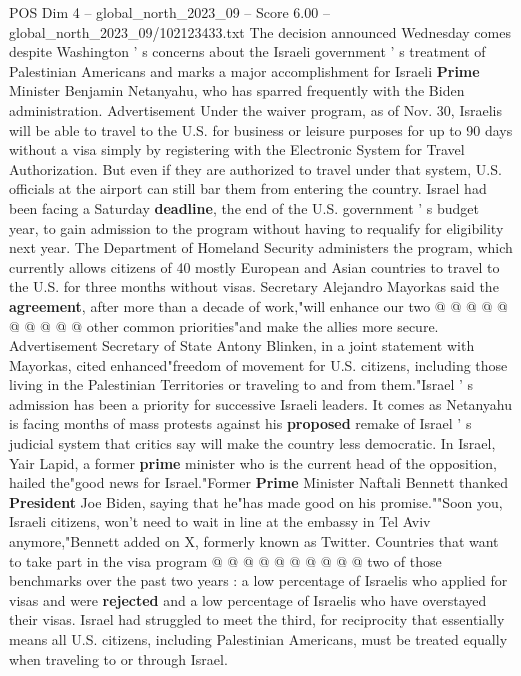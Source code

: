 \begin{textsample}{POS Dim 4 – global\_north\_2023\_09 – Score 6.00 – global\_north\_2023\_09/102123433.txt}  \label{ex:f4_pos_416}
The decision announced Wednesday comes despite Washington ' s concerns about the Israeli government ' s treatment of Palestinian Americans and marks a major accomplishment for Israeli \textbf{Prime} Minister Benjamin Netanyahu, who has sparred frequently with the Biden administration.
Advertisement Under the waiver program, as of Nov. 30, Israelis will be able to travel to the U.S. for business or leisure purposes for up to 90 days without a visa simply by registering with the Electronic System for Travel Authorization.
But even if they are authorized to travel under that system, U.S. officials at the airport can still bar them from entering the country.
Israel had been facing a Saturday \textbf{deadline}, the end of the U.S. government ' s budget year, to gain admission to the program without having to requalify for eligibility next year.
The Department of Homeland Security administers the program, which currently allows citizens of 40 mostly European and Asian countries to travel to the U.S. for three months without visas.
Secretary Alejandro Mayorkas said the \textbf{agreement}, after more than a decade of work,"will enhance our two @ @ @ @ @ @ @ @ @ @ other common priorities"and make the allies more secure.
Advertisement Secretary of State Antony Blinken, in a joint statement with Mayorkas, cited enhanced"freedom of movement for U.S. citizens, including those living in the Palestinian Territories or traveling to and from them."Israel ' s admission has been a priority for successive Israeli leaders.
It comes as Netanyahu is facing months of mass protests against his \textbf{proposed} remake of Israel ' s judicial system that critics say will make the country less democratic.
In Israel, Yair Lapid, a former \textbf{prime} minister who is the current head of the opposition, hailed the"good news for Israel."Former \textbf{Prime} Minister Naftali Bennett thanked \textbf{President} Joe Biden, saying that he"has made good on his promise.""Soon you, Israeli citizens, won't need to wait in line at the embassy in Tel Aviv anymore,"Bennett added on X, formerly known as Twitter.
Countries that want to take part in the visa program @ @ @ @ @ @ @ @ @ @ two of those benchmarks over the past two years : a low percentage of Israelis who applied for visas and were \textbf{rejected} and a low percentage of Israelis who have overstayed their visas.
Israel had struggled to meet the third, for reciprocity that essentially means all U.S. citizens, including Palestinian Americans, must be treated equally when traveling to or through Israel.

\end{textsample}
